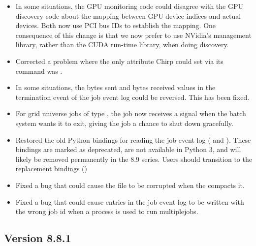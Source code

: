 \begin{itemize}

\item In some situations, the GPU monitoring code could disagree with the
GPU discovery code about the mapping between GPU device indices and actual
devices.  Both now use PCI bus IDs to establish the mapping.  One consequence
of this change is that we now prefer to use NVidia's management library,
rather than the CUDA run-time library, when doing discovery.

\item Corrected a problem where the only attribute Chirp could
set via its  command was .

\item In some situations, the bytes sent and bytes received values in
the termination event of the job event log could be reversed.
This has been fixed.

\item For grid universe jobs of type , the job now receives a
signal when the batch system wants it to exit, giving the job a chance to
shut down gracefully.

\item Restored the old Python bindings for reading the job event log
( and ).
These bindings are marked as deprecated, are not available in
Python 3, and will likely be removed permanently in the 8.9 series.
Users should transition to the replacement bindings ()

\item Fixed a bug that could cause the  file to
be corrupted when the  compacts it.

\item Fixed a bug that could cause entries in the job event log to be
written with the wrong job id when a  process is used to
run multiplejobs.

\end{itemize}

\subsection*{\label{sec:New-8-8-1}Version 8.8.1}

